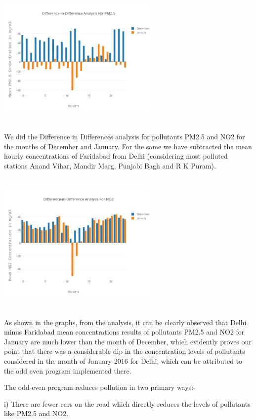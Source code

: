 \documentclass{report}
\begin{document}
\graphicspath{ {report/} }
\includegraphics[width=8cm, height=7cm]{hourly_PM25}

We did the Difference in Differences analysis for pollutants PM2.5 and NO2 for the months of December and January. For the same we have subtracted the mean hourly concentrations of Faridabad from Delhi (considering  most polluted stations Anand Vihar, Mandir Marg, Punjabi Bagh and R K Puram). 

\graphicspath{ {report/} }
\includegraphics[width=8cm, height=7cm]{hourly_NO2}

As shown in the graphs, from the analysis, it can be clearly observed that Delhi minus Faridabad mean concentrations results of pollutants PM2.5 and NO2 for January are much lower than the month of December, which evidently proves our point that there was a considerable dip in the concentration levels of pollutants considered in the month of January 2016 for Delhi, which can be attributed to the odd even program implemented there. 

The odd-even program reduces pollution in two primary ways:-

i) There are fewer cars on the road which directly reduces the levels of pollutants like PM2.5 and NO2.
\end{document}
